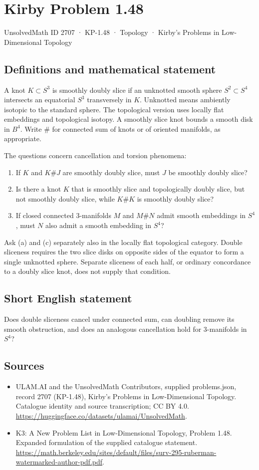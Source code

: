 \documentclass[11pt,a4paper]{article}
\begin{document}
\section*{Kirby Problem 1.48}\label{2707}
{\small UnsolvedMath ID 2707 · KP-1.48 · Topology · Kirby's Problems in Low-Dimensional Topology}
\subsection{Definitions and mathematical statement}
A knot $K\subset S^3$ is smoothly doubly slice if an unknotted smooth sphere
$S^2\subset S^4$ intersects an equatorial $S^3$ transversely in $K$. Unknotted
means ambiently isotopic to the standard sphere. The topological version uses
locally flat embeddings and topological isotopy. A smoothly slice knot bounds
a smooth disk in $B^4$. Write $\#$ for connected sum of knots or of oriented
manifolds, as appropriate.

The questions concern cancellation and torsion phenomena:
\begin{enumerate}
\item If $K$ and $K\#J$ are smoothly doubly slice, must $J$ be smoothly doubly slice?
\item Is there a knot $K$ that is smoothly slice and topologically doubly slice,
but not smoothly doubly slice, while $K\#K$ is smoothly doubly slice?
\item If closed connected $3$-manifolds $M$ and $M\#N$ admit smooth embeddings
in $S^4$, must $N$ also admit a smooth embedding in $S^4$?
\end{enumerate}
Ask (a) and (c) separately also in the locally flat topological category.
Double sliceness requires the two slice disks on opposite sides of the equator
to form a single unknotted sphere. Separate sliceness of each half, or ordinary
concordance to a doubly slice knot, does not supply that condition.
\subsection{Short English statement}
Does double sliceness cancel under connected sum, can doubling remove its smooth obstruction, and does an analogous cancellation hold for $3$-manifolds in $S^4$?
\subsection{Sources}
\begin{itemize}
\item[S1] ULAM.AI and the UnsolvedMath Contributors, supplied problems.json, record 2707 (KP-1.48), Kirby's Problems in Low-Dimensional Topology. Catalogue identity and source transcription; CC BY 4.0.
\url{https://huggingface.co/datasets/ulamai/UnsolvedMath}.
\item[S2] K3: A New Problem List in Low-Dimensional Topology, Problem 1.48. Expanded formulation of the supplied catalogue statement.
\url{https://math.berkeley.edu/sites/default/files/surv-295-ruberman-watermarked-author-pdf.pdf}.
\end{itemize}
\end{document}
